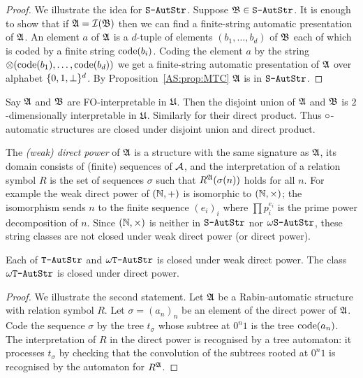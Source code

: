 \begin{proof}
We illustrate the idea for $\mbox{\tt S-AutStr}$. Suppose $\mathfrak{B} \in \mbox{\tt S-AutStr}$. It is enough to show that if $\mathfrak{A} = {\mathcal I}(\mathfrak{B})$ then we can find a finite-string automatic presentation of $\mathfrak{A}$. 
An element $a$ of $\mathfrak{A}$ is a $d$-tuple of elements $(b_1,\dots,b_d)$ of $\mathfrak{B}$ each of which is coded by a finite string 
${\rm code}({b_i})$. Coding the element $a$ by the string $\otimes({\rm code}({b_1}),\dots,{\rm code}({b_d}))$ we get a finite-string automatic presentation of $\mathfrak{A}$ over alphabet 
$\{0,1,{\perp}\}^d$. By Proposition~\ref{AS:prop:MTC} $\mathfrak{A}$ is in $\mbox{\tt S-AutStr}$.
\end{proof}


Say $\mathfrak{A}$ and $\mathfrak{B}$ are FO-interpretable in $\mathfrak{U}$. Then the disjoint union of $\mathfrak{A}$ and $\mathfrak{B}$ is $2$-dimensionally interpretable in $\mathfrak{U}$. Similarly for their direct product.
Thus $\circ$-automatic structures are closed under disjoint union and direct product.

The {\em (weak) direct power} of $\mathfrak{A}$ is a structure with the same signature as $\mathfrak{A}$, its domain consists 
of (finite) sequences of ${\mathcal A}$, and the 
interpretation of a relation symbol $R$ is the set of sequences $\sigma$ such that $R^{\mathfrak{A}}(\sigma(n))$ holds for all $n$.
For example the weak direct power of $(\mathbb{N},+)$ is isomorphic to $(\mathbb{N},\times)$; the isomorphism sends $n$ to  the finite sequence $(e_i)_i$ where
$ \prod p_i^{e_i}$ is the prime power decomposition of $n$. Since $(\mathbb{N},\times)$ is neither in $\mbox{\tt S-AutStr}$ nor $\mbox{\tt $\omega$S-AutStr}$, these string classes are not closed under weak direct power (or direct power).
 
\begin{proposition} \label{AS:prop:powerclosure} \cite{Blum99}
Each of  $\mbox{\tt T-AutStr}$ and $\mbox{\tt $\omega$T-AutStr}$ is closed under weak direct power. The class $\mbox{\tt $\omega$T-AutStr}$ is closed under direct power.
\end{proposition}

\begin{proof}
We illustrate the second statement.
Let $\mathfrak{A}$ be a Rabin-automatic structure with relation symbol $R$.
Let $\sigma = (a_n)_n$ be an element of the direct power of $\mathfrak{A}$.
Code the sequence $\sigma$ by the tree $t_\sigma$ whose subtree at $0^n1$ is the tree ${\rm code}({a_n})$.
The interpretation of $R$ in the direct power is recognised by a tree automaton: it  processes $t_\sigma$ by checking
that the convolution of the subtrees rooted at $0^n1$ is recognised by the automaton for $R^{\mathfrak{A}}$.
\end{proof}

